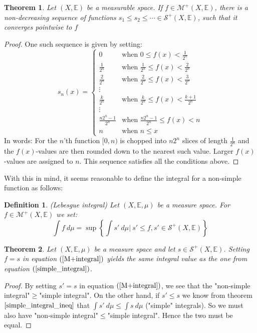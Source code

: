 \documentclass[12pt, a4paper]{article}
\newtheorem{theorem}{Theorem}[section]
\newtheorem{definition}{Definition}[section]
\numberwithin{equation}{section}
\begin{document}
\begin{theorem}
\label{simple_limit}
Let $(X,\mathbb{E})$ be a measurable space. If $f\in\mathcal{M}^+(X,\mathbb{E})$, there is a non-decreasing sequence of functions $s_1\le s_2\le\cdots\in\mathcal{S}^+(X,\mathbb{E})$, such that it converges pointwise to $f$
\end{theorem}
\begin{proof}
One such sequence is given by setting:
\begin{equation}
s_n(x)=
\begin{cases}
0					& \textrm{when }0\le f(x)<\frac{1}{2^n} \\
\frac{1}{2^n}		& \textrm{when }\frac{1}{2^n}\le f(x)<\frac{2}{2^n} \\
\frac{2}{2^n}		& \textrm{when }\frac{2}{2^n}\le f(x)<\frac{3}{2^n} \\
\vdots \\
\frac{k}{2^n}		& \textrm{when }\frac{k}{2^n}\le f(x)<\frac{k+1}{2^n} \\
\vdots \\
\frac{n2^n-1}{2^n}	& \textrm{when }\frac{n2^n-1}{2^n}\le f(x)<n \\
n					& \textrm{when }n\le x
\end{cases}
\end{equation}
In words: For the $n$'th function $[0,n)$ is chopped into $n2^n$ slices of length $\frac{1}{2^n}$ and the $f(x)$-values are then rounded down to the nearest such value. Larger $f(x)$-values are assigned to $n$. This sequence satisfies all the conditions above.
\end{proof}

With this in mind, it seems reasonable to define the integral for a non-simple function as follows:

\begin{definition}
\label{lebesque_integral}
(Lebesgue integral) Let $(X,\mathbb{E},\mu)$ be a measure space. For $f\in\mathcal{M}^+(X,\mathbb{E})$ we set:
\begin{equation}
\label{M+integral}
\int f\ d\mu = \sup\left\{\int s'\ d\mu|\ s'\le f, s'\in\mathcal{S}^+(X,\mathbb{E})\right\}
\end{equation}
\end{definition}

\begin{theorem}
Let $(X,\mathbb{E},\mu)$ be a measure space and let $s\in\mathcal{S}^+(X,\mathbb{E})$. Setting $f=s$ in equation $(\ref{M+integral})$ yields the same integral value as the one from equation $(\ref{simple_integral})$.
\end{theorem}
\begin{proof}
By setting $s'=s$ in equation $(\ref{M+integral})$, we see that the "non-simple integral"$\ge$"simple integral". On the other hand, if $s'\le s$ we know from theorem $\ref{simple_integral_ineq}$ that $\int s'\ d\mu\le\int s\ d\mu$ ("simple" integrals). So we must also have "non-simple integral"$\le$"simple integral". Hence the two must be equal.
\end{proof}
\end{document}
